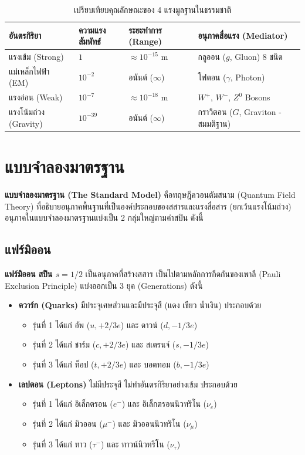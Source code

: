 \begin{table}[H]
\centering
\begin{tabularx}{\textwidth}{l Z Z Y}
\toprule
\textbf{อันตรกิริยา} & \textbf{ความแรงสัมพัทธ์} & \textbf{ระยะทำการ (Range)} & \textbf{อนุภาคสื่อแรง (Mediator)} \\
\midrule
แรงเข้ม (Strong) & $1$ & $\approx 10^{-15}\text{ m}$ & กลูออน ($g$, Gluon) 8 ชนิด \\
แม่เหล็กไฟฟ้า (EM) & $10^{-2}$ & อนันต์ ($\infty$) & โฟตอน ($\gamma$, Photon) \\
แรงอ่อน (Weak) & $10^{-7}$ & $\approx 10^{-18}\text{ m}$ & $W^+$, $W^-$, $Z^0$ Bosons \\
แรงโน้มถ่วง (Gravity) & $10^{-39}$ & อนันต์ ($\infty$) & กราวิตอน ($G$, Graviton - สมมติฐาน) \\
\bottomrule
\end{tabularx}
\caption{เปรียบเทียบคุณลักษณะของ 4 แรงมูลฐานในธรรมชาติ}
\label{tab:four_fundamental_forces}
\end{table}

\section{แบบจำลองมาตรฐาน}

\textbf{แบบจำลองมาตรฐาน (The Standard Model)} คือทฤษฎีควอนตัมสนาม (Quantum Field Theory) ที่อธิบายอนุภาคพื้นฐานที่เป็นองค์ประกอบของสสารและแรงสื่อสาร (ยกเว้นแรงโน้มถ่วง) อนุภาคในแบบจำลองมาตรฐานแบ่งเป็น 2 กลุ่มใหญ่ตามค่าสปิน ดังนี้

\subsection{แฟร์มิออน}
\textbf{แฟร์มิออน สปิน $s = 1/2$} เป็นอนุภาคที่สร้างสสาร เป็นไปตามหลักการกีดกันของเพาลี (Pauli Exclusion Principle) แบ่งออกเป็น 3 ยุค (Generations) ดังนี้
\begin{itemize}
    \item \textbf{ควาร์ก (Quarks)} มีประจุเศษส่วนและมีประจุสี (แดง เขียว น้ำเงิน) ประกอบด้วย
    \begin{itemize}
        \item รุ่นที่ 1 ได้แก่ อัพ ($u, +2/3e$) และ ดาวน์ ($d, -1/3e$)
        \item รุ่นที่ 2 ได้แก่ ชาร์ม ($c, +2/3e$) และ สเตรนจ์ ($s, -1/3e$)
        \item รุ่นที่ 3 ได้แก่ ท็อป ($t, +2/3e$) และ บอตทอม ($b, -1/3e$)
    \end{itemize}
    \item \textbf{เลปตอน (Leptons)} ไม่มีประจุสี ไม่ทำอันตรกิริยาอย่างเข้ม ประกอบด้วย
    \begin{itemize}
        \item รุ่นที่ 1 ได้แก่ อิเล็กตรอน ($e^-$) และ อิเล็กตรอนนิวทริโน ($\nu_e$)
        \item รุ่นที่ 2 ได้แก่ มิวออน ($\mu^-$) และ มิวออนนิวทริโน ($\nu_\mu$)
        \item รุ่นที่ 3 ได้แก่ ทาว ($\tau^-$) และ ทาวน์นิวทริโน ($\nu_\tau$)
    \end{itemize}
\end{itemize}

